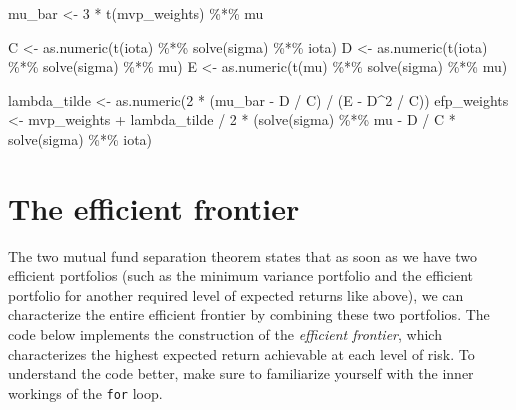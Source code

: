 \documentclass[
]{krantz}
\newenvironment{Shaded}{\begin{snugshade}}{\end{snugshade}}
\newcommand{\DecValTok}[1]{\textcolor[rgb]{0.06,0.06,0.06}{#1}}
\newcommand{\FunctionTok}[1]{\textcolor[rgb]{0,0,0}{#1}}
\newcommand{\NormalTok}[1]{#1}
\newcommand{\OtherTok}[1]{\textcolor[rgb]{0.37,0.37,0.37}{#1}}
\newcommand{\SpecialCharTok}[1]{\textcolor[rgb]{0,0,0}{#1}}
\begin{document}
\begin{Shaded}
\begin{Highlighting}[]
\NormalTok{mu\_bar }\OtherTok{\textless{}{-}} \DecValTok{3} \SpecialCharTok{*} \FunctionTok{t}\NormalTok{(mvp\_weights) }\SpecialCharTok{\%*\%}\NormalTok{ mu}

\NormalTok{C }\OtherTok{\textless{}{-}} \FunctionTok{as.numeric}\NormalTok{(}\FunctionTok{t}\NormalTok{(iota) }\SpecialCharTok{\%*\%} \FunctionTok{solve}\NormalTok{(sigma) }\SpecialCharTok{\%*\%}\NormalTok{ iota)}
\NormalTok{D }\OtherTok{\textless{}{-}} \FunctionTok{as.numeric}\NormalTok{(}\FunctionTok{t}\NormalTok{(iota) }\SpecialCharTok{\%*\%} \FunctionTok{solve}\NormalTok{(sigma) }\SpecialCharTok{\%*\%}\NormalTok{ mu)}
\NormalTok{E }\OtherTok{\textless{}{-}} \FunctionTok{as.numeric}\NormalTok{(}\FunctionTok{t}\NormalTok{(mu) }\SpecialCharTok{\%*\%} \FunctionTok{solve}\NormalTok{(sigma) }\SpecialCharTok{\%*\%}\NormalTok{ mu)}

\NormalTok{lambda\_tilde }\OtherTok{\textless{}{-}} \FunctionTok{as.numeric}\NormalTok{(}\DecValTok{2} \SpecialCharTok{*}\NormalTok{ (mu\_bar }\SpecialCharTok{{-}}\NormalTok{ D }\SpecialCharTok{/}\NormalTok{ C) }\SpecialCharTok{/}\NormalTok{ (E }\SpecialCharTok{{-}}\NormalTok{ D}\SpecialCharTok{\^{}}\DecValTok{2} \SpecialCharTok{/}\NormalTok{ C))}
\NormalTok{efp\_weights }\OtherTok{\textless{}{-}}\NormalTok{ mvp\_weights }\SpecialCharTok{+}\NormalTok{ lambda\_tilde }\SpecialCharTok{/} \DecValTok{2} \SpecialCharTok{*}\NormalTok{ (}\FunctionTok{solve}\NormalTok{(sigma) }\SpecialCharTok{\%*\%}\NormalTok{ mu }\SpecialCharTok{{-}}\NormalTok{ D }\SpecialCharTok{/}\NormalTok{ C }\SpecialCharTok{*} \FunctionTok{solve}\NormalTok{(sigma) }\SpecialCharTok{\%*\%}\NormalTok{ iota)}
\end{Highlighting}
\end{Shaded}

\hypertarget{the-efficient-frontier}{%
\section{The efficient frontier}\label{the-efficient-frontier}}

The two mutual fund separation theorem states that as soon as we have two efficient portfolios (such as the minimum variance portfolio and the efficient portfolio for another required level of expected returns like above), we can characterize the entire efficient frontier by combining these two portfolios. The code below implements the construction of the \emph{efficient frontier}, which characterizes the highest expected return achievable at each level of risk. To understand the code better, make sure to familiarize yourself with the inner workings of the \texttt{for} loop.
\end{document}
